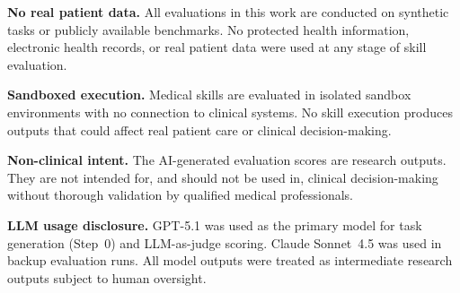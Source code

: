 
\noindent
\textbf{No real patient data.}\quad
All evaluations in this work are conducted on synthetic tasks or publicly available benchmarks.
No protected health information, electronic health records, or real patient data were used at any stage of skill evaluation.

\textbf{Sandboxed execution.}\quad
Medical skills are evaluated in isolated sandbox environments with no connection to clinical systems.
No skill execution produces outputs that could affect real patient care or clinical decision-making.

\textbf{Non-clinical intent.}\quad
The AI-generated evaluation scores are research outputs.
They are not intended for, and should not be used in, clinical decision-making without thorough validation by qualified medical professionals.

\textbf{LLM usage disclosure.}\quad
GPT-5.1 was used as the primary model for task generation (Step~0) and LLM-as-judge scoring.
Claude Sonnet~4.5 was used in backup evaluation runs.
All model outputs were treated as intermediate research outputs subject to human oversight.
